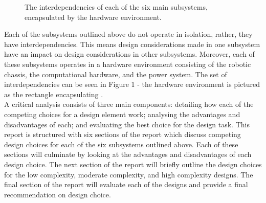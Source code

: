 \documentclass[a4paper]{article}
\begin{document}
\vspace{0.5cm}
\begin{figure}[h]
\centering
{}
\vspace{0.5cm}
\caption{The interdependencies of each of the six main subsystems, encapsulated by the hardware environment.}
\end{figure}

Each of the subsystems outlined above do not operate in isolation, rather, they have interdependencies. This means design considerations made in one subsystem have an impact on design considerations in other subsystems. Moreover, each of these subsystems operates in a hardware environment consisting of the robotic chassis, the computational hardware, and the power system. The set of interdependencies can be seen in Figure 1 - the hardware environment is pictured as the rectangle encapsulating .\\

A critical analysis consists of three main components: detailing how each of the competing choices for a design element work; analysing the advantages and disadvantages of each; and evaluating the best choice for the design task. This report is structured with six sections of the report which discuss competing design choices for each of the six subsystems outlined above. Each of these sections will culminate by looking at the advantages and disadvantages of each design choice. The next section of the report will briefly outline the design choices for the low complexity, moderate complexity, and high complexity designs. The final section of the report will evaluate each of the designs and provide a final recommendation on design choice.  
\end{document}
